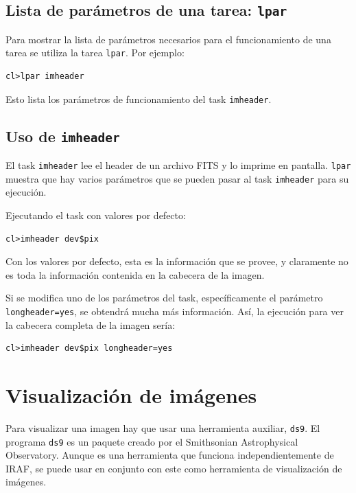 \subsection{Lista de parámetros de una tarea: \texttt{lpar}}

Para mostrar la lista de parámetros necesarios para el funcionamiento de una tarea se utiliza la tarea \texttt{lpar}. Por ejemplo:

\begin{verbatim}
cl>lpar imheader
\end{verbatim}

Esto lista los parámetros de funcionamiento del task \texttt{imheader}.

\subsection{Uso de \texttt{imheader}}

El task \texttt{imheader} lee el header de un archivo FITS y lo imprime en pantalla. \texttt{lpar} muestra que hay varios parámetros que se pueden pasar al task \texttt{imheader} para su ejecución.

Ejecutando el task con valores por defecto:

\begin{verbatim}
cl>imheader dev$pix
\end{verbatim}

Con los valores por defecto, esta es la información que se provee, y claramente no es toda la información contenida en la cabecera de la imagen.

Si se modifica uno de los parámetros del task, específicamente el parámetro \texttt{longheader=yes}, se obtendrá mucha más información. Así, la ejecución para ver la cabecera completa de la imagen sería:

\begin{verbatim}
cl>imheader dev$pix longheader=yes
\end{verbatim}

\section{Visualización de imágenes}

Para visualizar una imagen hay que usar una herramienta auxiliar, \texttt{ds9}. El programa \texttt{ds9} es un paquete creado por el Smithsonian Astrophysical Observatory. Aunque es una herramienta que funciona independientemente de IRAF, se puede usar en conjunto con este como herramienta de visualización de imágenes.

